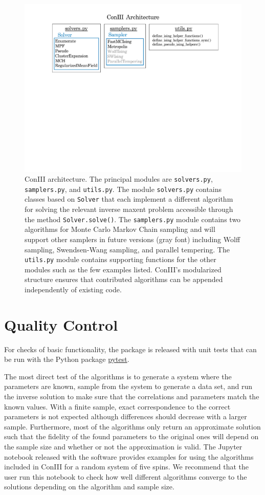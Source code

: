 \documentclass{jors}
\begin{document}
\begin{figure}[tb]
	\includegraphics[width=\linewidth,clip=True,trim=100 360 80 0]{architecture}
	\caption{ConIII architecture. The principal modules are {\tt solvers.py}, {\tt samplers.py}, and {\tt utils.py}. The module {\tt solvers.py} contains classes based on {\tt Solver} that each implement a different algorithm for solving the relevant inverse maxent problem accessible through the method {\tt Solver.solve()}. The {\tt samplers.py} module contains two algorithms for Monte Carlo Markov Chain sampling and will support other samplers in future versions (gray font) including Wolff sampling, Swendsen-Wang sampling, and parallel tempering. The {\tt utils.py} module contains supporting functions for the other modules such as the few examples listed. ConIII's modularized structure ensures that contributed algorithms can be appended independently of existing code.}
	\label{gr:architecture}
\end{figure}


\section*{Quality Control}
For checks of basic functionality, the package is released with unit tests that can be run with the Python package \href{https://pytest.org}{pytest}.

The most direct test of the algorithms is to generate a system where the parameters are known, sample from the system to generate a data set, and run the inverse solution to make sure that the correlations and parameters match the known values. With a finite sample, exact correspondence to the correct parameters is not expected although differences should decrease with a larger sample. Furthermore, most of the algorithms only return an approximate solution such that the fidelity of the found parameters to the original ones will depend on the sample size and whether or not the approximation is valid. The Jupyter notebook released with the software provides examples for using the algorithms included in ConIII for a random system of five spins. We recommend that the user run this notebook to check how well different algorithms converge to the solutions depending on the algorithm and sample size.
\end{document}
